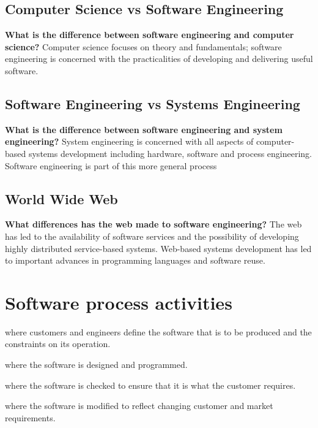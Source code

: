 \documentclass{report}
\begin{document}
\subsection{Computer Science vs Software Engineering}
\noindent\textbf{What is the difference between software engineering and computer science?}\newline
Computer science focuses on theory and fundamentals; software engineering is concerned with the practicalities of developing and delivering useful software.

\subsection{Software Engineering vs Systems Engineering}
\noindent\textbf{What is the difference between software engineering and system engineering?}\newline
System engineering is concerned with all aspects of computer-based systems development including hardware, software and process engineering. Software engineering is part of this more general process

\subsection{World Wide Web}
\noindent\textbf{What differences has the web made to software engineering?}\newline
The web has led to the availability of software services and the possibility of developing highly distributed service-based systems. Web-based systems development has led to important advances in programming languages and software reuse.

\newpage
\section{Software process activities}
\begin{description}[style=multiline,leftmargin=12em]
  \item [Software specification] where customers and engineers
define the software that is to be produced and the constraints on its operation.
  \item [Software development] where the software is designed and programmed.
  \item [Software validation] where the software is checked to ensure that it is what the customer requires.
  \item [Software evolution] where the software is modified to reflect changing customer and market requirements.
\end{description}
\end{document}
